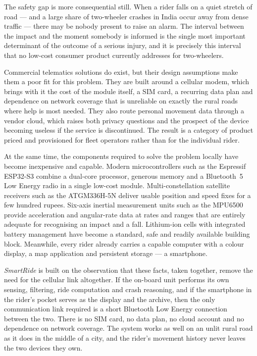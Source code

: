\documentclass[12pt,a4paper,oneside]{report}
\begin{document}
The safety gap is more consequential still. When a rider falls on a quiet stretch of road
--- and a large share of two-wheeler crashes in India occur away from dense traffic --- there
may be nobody present to raise an alarm. The interval between the impact and the moment
somebody is informed is the single most important determinant of the outcome of a serious
injury, and it is precisely this interval that no low-cost consumer product currently
addresses for two-wheelers.

Commercial telematics solutions do exist, but their design assumptions make them a poor fit
for this problem. They are built around a cellular modem, which brings with it the cost of
the module itself, a SIM card, a recurring data plan and dependence on network coverage that
is unreliable on exactly the rural roads where help is most needed. They also route personal
movement data through a vendor cloud, which raises both privacy questions and the prospect
of the device becoming useless if the service is discontinued. The result is a category of
product priced and provisioned for fleet operators rather than for the individual rider.

At the same time, the components required to solve the problem locally have become
inexpensive and capable. Modern microcontrollers such as the Espressif ESP32-S3 combine a
dual-core processor, generous memory and a Bluetooth~5 Low Energy radio in a single
low-cost module. Multi-constellation satellite receivers such as the ATGM336H-5N deliver
usable position and speed fixes for a few hundred rupees. Six-axis inertial measurement
units such as the MPU6500 provide acceleration and angular-rate data at rates and ranges
that are entirely adequate for recognising an impact and a fall. Lithium-ion cells with
integrated battery management have become a standard, safe and readily available building
block. Meanwhile, every rider already carries a capable computer with a colour display, a
map application and persistent storage --- a smartphone.

\textit{SmartRide} is built on the observation that these facts, taken together, remove the
need for the cellular link altogether. If the on-board unit performs its own sensing,
filtering, ride computation and crash reasoning, and if the smartphone in the rider's pocket
serves as the display and the archive, then the only communication link required is a short
Bluetooth Low Energy connection between the two. There is no SIM card, no data plan, no
cloud account and no dependence on network coverage. The system works as well on an
unlit rural road as it does in the middle of a city, and the rider's movement history never
leaves the two devices they own.
\end{document}
